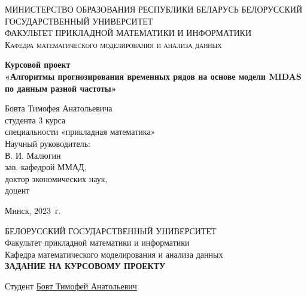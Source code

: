 \documentclass[a4paper, 14pt]{extarticle}
\begin{document}
	\def\contentsname{ОГЛАВЛЕНИЕ}
	
	\begin{titlepage}
		\begin{center}
			\textsc{МИНИСТЕРСТВО ОБРАЗОВАНИЯ РЕСПУБЛИКИ БЕЛАРУСЬ БЕЛОРУССКИЙ ГОСУДАРСТВЕННЫЙ УНИВЕРСИТЕТ
				\\[5mm]
				ФАКУЛЬТЕТ ПРИКЛАДНОЙ МАТЕМАТИКИ И ИНФОРМАТИКИ\\[2mm]
				Кафедра математического моделирования и анализа данных
			}
			
			\vfill
			
			\textbf{Курсовой проект
				\\[3mm]
				«Алгоритмы прогнозирования временных рядов на основе модели MIDAS по данным разной частоты»
				\\[26mm]
			}
		\end{center}
		
		\hfill
		\begin{minipage}{.5\textwidth}
			\begin{flushright}
			Бовта Тимофея Анатольевича\\
			студента 3 курса\\
			специальности «прикладная математика»\\[5mm]
			
			Научный руководитель:\\[2mm] 
			В. И. Малюгин\\
			зав. кафедрой ММАД,\\
			доктор экономических наук,\\
			доцент
			\end{flushright}
		\end{minipage}%
		\vfill
		\begin{center}
			Минск, 2023\ г.
		\end{center}
	\end{titlepage}
	\newpage
	\setcounter{page}{2}
	\begin{center}
		\large{БЕЛОРУССКИЙ ГОСУДАРСТВЕННЫЙ УНИВЕРСИТЕТ}
		\\[2mm]
		Факультет прикладной математики и информатики\\[5mm]
		Кафедра математического моделирования и анализа данных\\[5mm]
		\large{\textbf{ЗАДАНИЕ НА КУРСОВОМУ ПРОЕКТУ\\[20mm]}}
	\end{center}
	Студент \quad \underline{Бовт Тимофей Анатольевич\hspace*{\linegoal}}\\[2mm]
\end{document}
